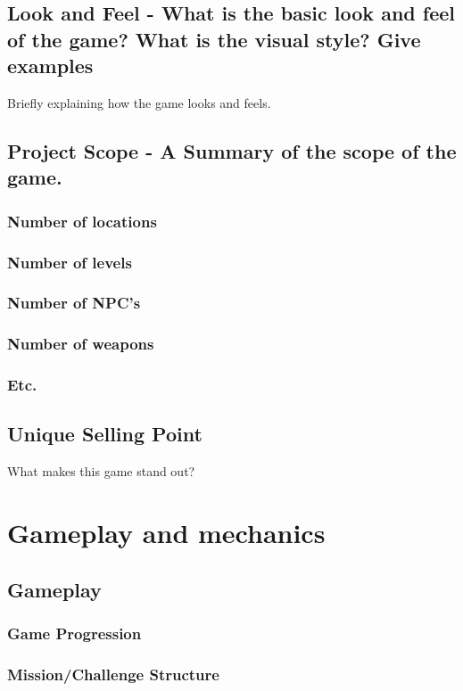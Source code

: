 \documentclass[article, 11pt]{article}
\begin{document}
\subsection{Look and Feel - What is the basic look and feel of the game? What is the visual style? Give examples}
\label{sec:org5c2b2d1}
Briefly explaining how the game looks and feels.
\subsection{Project Scope - A Summary of the scope of the game.}
\label{sec:org7bbcfe3}
\subsubsection{Number of locations}
\label{sec:orgce2caf4}
\subsubsection{Number of levels}
\label{sec:org60de23d}
\subsubsection{Number of NPC's}
\label{sec:orgc00d0c8}
\subsubsection{Number of  weapons}
\label{sec:org12090dc}
\subsubsection{Etc.}
\label{sec:orgcc0498b}
\subsection{Unique Selling Point}
\label{sec:orge9d0199}
What makes this game stand out?

\section{Gameplay and mechanics}
\label{sec:org41212f7}
\subsection{Gameplay}
\label{sec:org7a82921}
\subsubsection{Game Progression}
\label{sec:orgc3f6270}
\subsubsection{Mission/Challenge Structure}
\label{sec:org840efdc}
\end{document}
